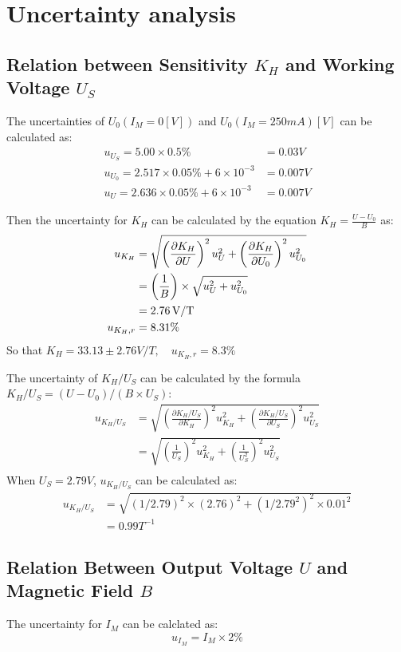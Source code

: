 \documentclass[12pt, a4paper]{article}
\begin{document}
\section{Uncertainty analysis}
\subsection{Relation between Sensitivity $K_H$ and Working Voltage $U_S$}
The uncertainties of $U_0(I_M = 0[V])$ and $U_0(I_M = 250mA)[V]$ can be calculated as:
\begin{align*}
	u_{U_S} = 5.00 \times 0.5\% &= 0.03V
	\\
	u_{U_0} = 2.517 \times 0.05\% + 6 \times 10^{-3} &= 0.007V
	\\
	u_U = 2.636 \times 0.05\% + 6 \times 10^{-3} &= 0.007V	
\end{align*}

Then the uncertainty for $K_H$ can be calculated by the equation $K_H=\frac{U-U_0}{B}$ as:
\begin{align*}
	u_{K_H}&=\sqrt{\left(\frac{\partial K_H}{\partial U}\right)^2u_U^2+\left(\frac{\partial K_H}{\partial U_0}\right)^2u_{U_0}^2}\\
	&=\left(\frac{1}{B}\right)\times\sqrt{u_U^2+u_{U_0}^2}\\
	&=2.76\,\rm{V/T}\\
	u_{K_{H},r} &=8.31\% 
\end{align*}
So that $K_H = 33.13\pm2.76V/T, \quad u_{K_H,r} = 8.3\%$

The uncertainty of $K_H/U_S$ can be calculated by the formula $K_H/U_S = (U-U_0)/(B\times U_S)$:
\begin{align*}
	u_{K_H/U_S}&=\sqrt{\left(\frac{\partial K_H/U_S}{\partial K_H}\right)^2u_{K_H}^2+\left(\frac{\partial K_H/U_S}{\partial U_S}\right)^2u_{U_S}^2}\\
	&=\sqrt{\left(\frac{1}{U_S}\right)^2u_{K_H}^2+\left(\frac{1}{U_S^2}\right)^2u_{U_S}^2}\\
\end{align*}
When $U_S = 2.79V$, $u_{K_H/U_S}$ can be calculated as:
\begin{align*}
	u_{K_H/U_S} &= \sqrt{(1/2.79)^2 \times (2.76)^2 + (1/2.79^2)^2 \times 0.01^2}\\
				&= 0.99 T^{-1}
\end{align*}

\subsection{Relation Between Output Voltage $U$ and Magnetic Field $B$}
The uncertainty for $I_M$ can be calclated as:
$$
u_{I_M} = I_M \times 2\%
$$
\end{document}
